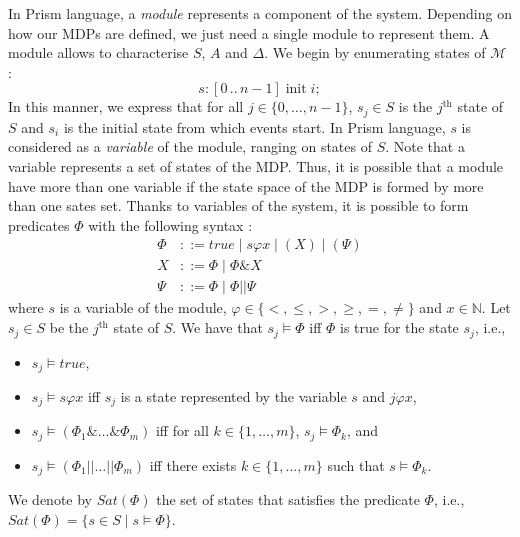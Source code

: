 In Prism language, a \textit{module} represents a component of the system.
Depending on how our MDPs are defined, we just need a single module to
represent them. A module allows to characterise $S$, $A$ and $\Delta$. We begin by enumerating states of $\mathcal{M}$ :
\[
  s: [0\, ..\, n-1] \; \text{init} \; i;
\]
In this manner, we express that for all $j \in \{0, \dots, n-1\}$, $s_j \in S$
is the $j^{\text{th}}$ state of $S$ and $s_i$ is the initial state from which events start. In Prism language, $s$ is considered as a \textit{variable} of the module, ranging on states of $S$. Note that a variable represents a set of states of the MDP. Thus, it is possible that a module have more than one variable if the state space of the MDP is formed by more than one sates set.
Thanks to variables of the system, it is possible to form predicates $\Phi$ with the following  syntax :
\begin{align*}
  \Phi &::= true \; | \; s \varphi x \; | \; (X) \; | \; (\Psi) \\
  X &::= \Phi \; | \; \Phi \& X \\
  \Psi &::= \Phi \; | \; \Phi || \Psi
\end{align*}
where $s$ is a variable of the module, $\varphi \in \{<, \leq, >, \geq, =, \neq\}$
and $x \in \mathbb{N}$. Let $s_j \in S$ be the $j^\text{th}$ state of $S$. We have that $s_j \models \Phi$ iff $\Phi$ is true for the state $s_j$, i.e.,
\begin{itemize}
  \item $s_j \models true$,
  \item $s_j \models s \varphi x$ iff $s_j$ is a state represented by the variable $s$ and $j \varphi x$,
  \item $s_j \models (\Phi_1 \& \dots \& \Phi_m)$ iff
    for all $k \in \{1, \dots, m\}$, $s_j \models \Phi_k$, and
  \item $s_j \models (\Phi_1 || \dots || \Phi_m)$ iff
    there exists $k \in \{1, \dots, m\}$ such that $s \models \Phi_k$.
\end{itemize}
We denote by $Sat(\Phi)$ the set of states that satisfies the predicate $\Phi$, i.e., $Sat(\Phi) = \{s \in S \; | \; s \models \Phi\}$. \\

